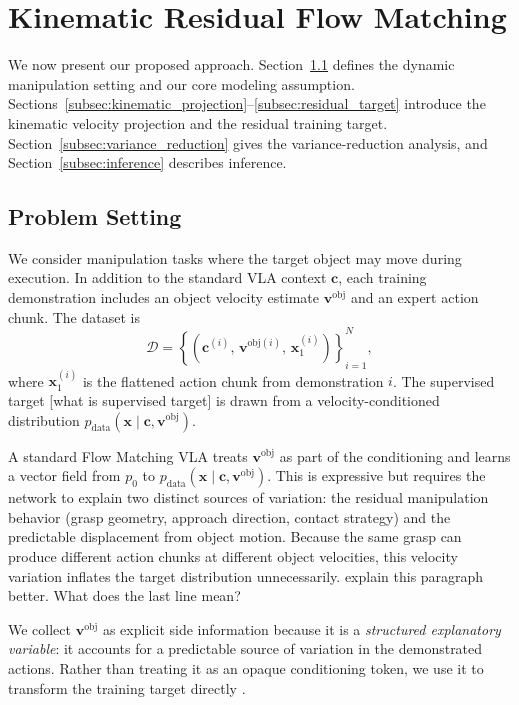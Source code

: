 \documentclass[10pt,twocolumn,letterpaper]{article}
\newcommand{\EditAP}[1]{{\color{blue} #1}}
\begin{document}
\section{Kinematic Residual Flow Matching}
\label{sec:method}

We now present our proposed approach. Section~\ref{subsec:problem_setting} defines the
dynamic manipulation setting and our core modeling assumption.
Sections~\ref{subsec:kinematic_projection}--\ref{subsec:residual_target}
introduce the kinematic velocity projection and the residual training target.
Section~\ref{subsec:variance_reduction} gives the variance-reduction analysis,
and Section~\ref{subsec:inference} describes inference.

\subsection{Problem Setting}
\label{subsec:problem_setting}

We consider manipulation tasks where the target object may move during
execution. In addition to the standard VLA context $\mathbf c$, each training
demonstration includes an object velocity estimate $\mathbf v^\text{obj}$ and an
expert action chunk. The dataset is
\[
    \mathcal D = \left\{
        \left(\mathbf c^{(i)},\, \mathbf v^{\text{obj}(i)},\, \mathbf x_1^{(i)}\right)
    \right\}_{i=1}^N,
\]
where $\mathbf x_1^{(i)}$ is the flattened action chunk from demonstration $i$.
The supervised target \EditAP{[what is supervised target]} is drawn from a velocity-conditioned distribution
$p_{\mathrm{data}}(\mathbf x \mid \mathbf c, \mathbf v^\text{obj})$.

A standard Flow Matching VLA treats $\mathbf v^\text{obj}$ as part of the conditioning
and learns a vector field from $p_0$ to
$p_{\mathrm{data}}(\mathbf x \mid \mathbf c, \mathbf v^\text{obj})$. This is
expressive but requires the network to explain two distinct sources of
variation: the residual manipulation behavior (grasp geometry, approach
direction, contact strategy) and the predictable displacement from object
motion. Because the same grasp can produce different action chunks at different
object velocities, this velocity variation inflates the target distribution
unnecessarily. \EditAP{explain this paragraph better. What does the last line mean?}

We collect $\mathbf v^\text{obj}$ as explicit side information because it is a
\emph{structured explanatory variable}: it accounts for a predictable source of
variation in the demonstrated actions. Rather than treating it as an opaque
conditioning token, we use it to transform the training target directly
\citep{vapnik2009lupi,chen2020learningbycheating}.
\end{document}
